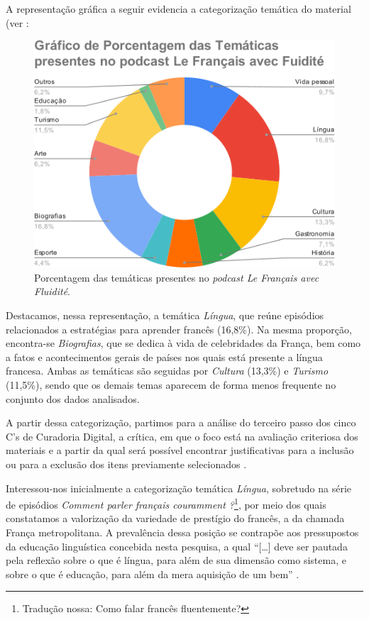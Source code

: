 \documentclass[portuguese]{textolivre}
\begin{document}
A representação gráfica a seguir evidencia a categorização temática do material (ver :

\begin{figure}
    \centering
    \begin{minipage}{.75\textwidth}
    \includegraphics[width=\linewidth]{Fig1.png}
    \caption{Porcentagem das temáticas presentes no \textit{podcast Le Français avec Fluidité}.}
    \label{fig1}
    \end{minipage}
\end{figure}

Destacamos, nessa representação, a temática \textit{Língua}, que reúne episódios relacionados a estratégias para aprender francês (16,8\%). Na mesma proporção, encontra-se \textit{Biografias}, que se dedica à vida de celebridades da França, bem como a fatos e acontecimentos gerais de países nos quais está presente a língua francesa. Ambas as temáticas são seguidas por \textit{Cultura} (13,3\%) e \textit{Turismo} (11,5\%), sendo que os demais temas aparecem de forma menos frequente no conjunto dos dados analisados.

A partir dessa categorização, partimos para a análise do terceiro passo dos cinco C’s de Curadoria Digital, a crítica, em que o foco está na avaliação criteriosa dos materiais e a partir da qual será possível encontrar justificativas para a inclusão ou para a exclusão dos itens previamente selecionados \cite{deschaine_five_2015}. 

Interessou-nos inicialmente a categorização temática \textit{Língua}, sobretudo na série de episódios \textit{Comment parler français couramment ?}\footnote{Tradução nossa: Como falar francês fluentemente?}, por meio dos quais constatamos a valorização da variedade de prestígio do francês, a da chamada França metropolitana. A prevalência dessa posição se contrapõe aos pressupostos da educação linguística concebida nesta pesquisa, a qual “[…] deve ser pautada pela reflexão sobre o que é língua, para além de sua dimensão como sistema, e sobre o que é educação, para além da mera aquisição de um bem” \cite{grilli_por_2021}.
\end{document}
